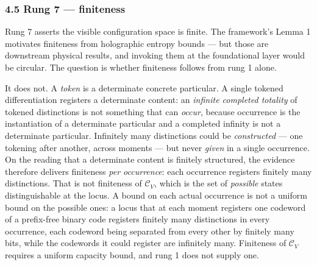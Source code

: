 \documentclass[
]{article}
\begin{document}
\hypertarget{rung-7-finiteness}{%
\subsubsection{4.5 Rung 7 --- finiteness}\label{rung-7-finiteness}}

Rung 7 asserts the visible configuration space is finite. The
framework's Lemma 1 motivates finiteness from holographic entropy bounds
--- but those are downstream physical results, and invoking them at the
foundational layer would be circular. The question is whether finiteness
follows from rung 1 alone.

It does not. A \emph{token} is a determinate concrete particular. A
single tokened differentiation registers a determinate content: an
\emph{infinite completed totality} of tokened distinctions is not
something that can \emph{occur}, because occurrence is the instantiation
of a determinate particular and a completed infinity is not a
determinate particular. Infinitely many distinctions could be
\emph{constructed} --- one tokening after another, across moments ---
but never \emph{given} in a single occurrence. On the reading that a
determinate content is finitely structured, the evidence therefore
delivers finiteness \emph{per occurrence}: each occurrence registers
finitely many distinctions. That is not finiteness of \(\mathcal{C}_V\),
which is the set of \emph{possible} states distinguishable at the locus.
A bound on each actual occurrence is not a uniform bound on the possible
ones: a locus that at each moment registers one codeword of a
prefix-free binary code registers finitely many distinctions in every
occurrence, each codeword being separated from every other by finitely
many bits, while the codewords it could register are infinitely many.
Finiteness of \(\mathcal{C}_V\) requires a uniform capacity bound, and
rung 1 does not supply one.
\end{document}
